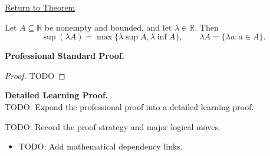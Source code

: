 \newpage
{}
\label{prf:supremum-dilation}

\begin{remark*}[Return]
\hyperref[thm:supremum-dilation]{Return to Theorem}
\end{remark*}

\begin{theorem*}
Let $A\subseteq\mathbb{R}$ be nonempty and bounded, and let $\lambda\in\mathbb{R}$. Then
\[
  \sup(\lambda A)=\max\{\lambda\sup A,\lambda\inf A\},
  \qquad
  \lambda A=\{\lambda a:a\in A\}.
\]
\end{theorem*}

\textbf{Professional Standard Proof.}~\\
\begin{proof}
TODO
\end{proof}

\textbf{Detailed Learning Proof.}~\\
TODO: Expand the professional proof into a detailed learning proof.

\begin{remark*}
TODO: Record the proof strategy and major logical moves.
\end{remark*}

\begin{dependencies}
\begin{itemize}
  \item TODO: Add mathematical dependency links.
\end{itemize}
\end{dependencies}
